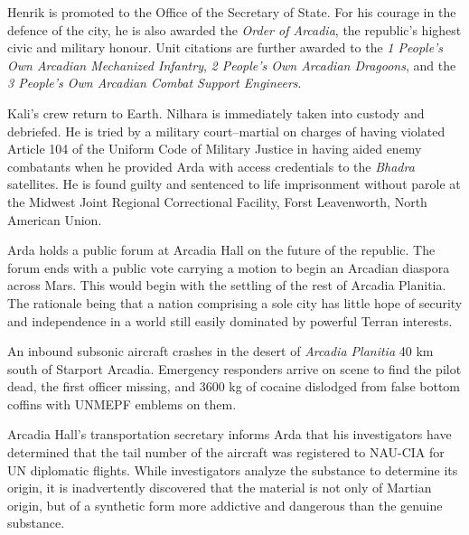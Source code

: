 Henrik is promoted to the Office of the Secretary of State. For his courage in the defence of the city, he is also awarded the {\it Order of Arcadia}, the republic's highest civic and military honour. Unit citations are further awarded to the {\it 1 People's Own Arcadian Mechanized Infantry}, {\it 2 People's Own Arcadian Dragoons}, and the {\it 3 People's Own Arcadian Combat Support Engineers}.
\StopTimelineDate

Kali's crew return to Earth. Nilhara is immediately taken into custody and debriefed. He is tried by a military court--martial on charges of having violated Article 104 of the Uniform Code of Military Justice in having aided enemy combatants when he provided Arda with access credentials to the {\it Bhadra} satellites. He is found guilty and sentenced to life imprisonment without parole at the Midwest Joint Regional Correctional Facility, Forst Leavenworth, North American Union.
\StopTimelineDate

Arda holds a public forum at Arcadia Hall on the future of the republic. The forum ends with a public vote carrying a motion to begin an Arcadian diaspora across Mars. This would begin with the settling of the rest of Arcadia Planitia. The rationale being that a nation comprising a sole city has little hope of security and independence in a world still easily dominated by powerful Terran interests.
\StopTimelineDate

An inbound subsonic aircraft crashes in the desert of {\it Arcadia Planitia} 40 km south of Starport Arcadia. Emergency responders arrive on scene to find the pilot dead, the first officer missing, and 3600 kg of cocaine dislodged from false bottom coffins with UNMEPF emblems on them. 

Arcadia Hall's transportation secretary informs Arda that his investigators have determined that the tail number of the aircraft was registered to NAU-CIA for UN diplomatic flights. While investigators analyze the substance to determine its origin, it is inadvertently discovered that the material is not only of Martian origin, but of a synthetic form more addictive and dangerous than the genuine substance.
\StopTimelineDate

